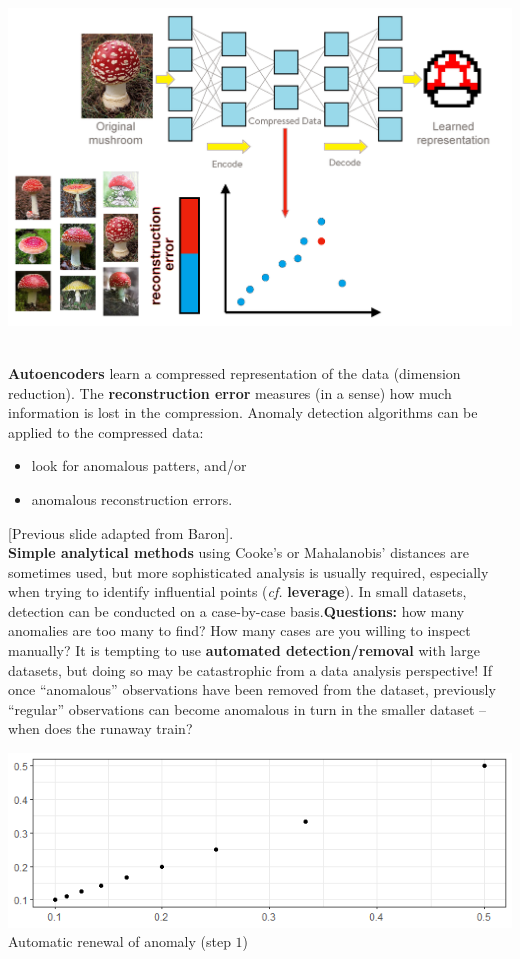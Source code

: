 \documentclass[20pt,landscape,footrule,headrule]{foils}
\newcommand{\newl}{\newline\newline}
\begin{document}
\newpage
\begin{center}
\includegraphics[width=\textwidth]{Images/autoencoder2.png}
\end{center}
\newpage \ \\ \noindent
\noindent \textbf{Autoencoders} learn a compressed representation of the data (dimension reduction).
\newl The \textbf{reconstruction error} measures (in a sense) how much information is lost in the compression. 
\newl Anomaly detection algorithms can be applied to the compressed data:
\begin{itemize}
\item look for anomalous patters, and/or
\item anomalous reconstruction errors. 
\end{itemize}
[Previous slide adapted from Baron].
\newpage\ \\ \noindent
\textbf{Simple analytical methods} using Cooke's or Mahalanobis' distances are sometimes used, but more sophisticated analysis is usually required, especially when trying to identify influential points (\textit{cf.} \textbf{leverage}). 
\newl 
In small datasets, detection can be conducted on a case-by-case basis.\newl \textbf{Questions:} how many anomalies are too many to find? How many cases are you willing to inspect manually? 
\newl It is tempting to use \textbf{automated detection/removal} with large datasets, but doing so may be catastrophic from a data analysis perspective!
\newl If once ``anomalous'' observations have been removed from the dataset, previously ``regular'' observations can become anomalous in turn in the smaller dataset -- when does the runaway train?
\newpage\ \\ 
\begin{center}
\includegraphics[width=\textwidth]{Images/ADOA1.png} \\ Automatic renewal of anomaly (step $1$)
\end{center}
\end{document}
